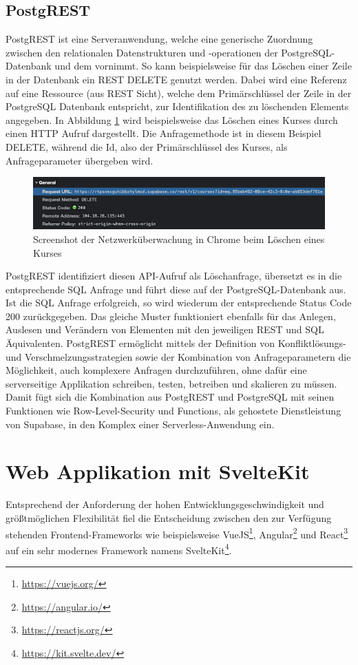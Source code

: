 \subsection{PostgREST}
PostgREST ist eine Serveranwendung, welche eine generische Zuordnung zwischen den relationalen Datenstrukturen und -operationen der PostgreSQL-Datenbank und dem  \cite[Kapitel 5]{fielding00} vornimmt. So kann beispielsweise für das Löschen einer Zeile in der Datenbank ein REST DELETE genutzt werden. Dabei wird eine Referenz auf eine Ressource (aus REST Sicht), welche dem Primärschlüssel der Zeile in der PostgreSQL Datenbank entspricht, zur Identifikation des zu löschenden Elements angegeben. In Abbildung \ref{fig:delete} wird beispielsweise das Löschen eines Kurses durch einen HTTP Aufruf dargestellt. Die Anfragemethode ist in diesem Beispiel DELETE, während die Id, also der Primärschlüssel des Kurses, als Anfrageparameter übergeben wird.
\begin{figure}[H]
    \centering
    \includegraphics[width = .9\textwidth]{images/rest.png}
    \caption{Screenshot der Netzwerküberwachung in Chrome beim Löschen eines Kurses}
    \label{fig:delete}
\end{figure}
\noindent PostgREST identifiziert diesen API-Aufruf als Löschanfrage, übersetzt es in die entsprechende SQL Anfrage und führt diese auf der PostgreSQL-Datenbank aus. Ist die SQL Anfrage erfolgreich, so wird wiederum der entsprechende Status Code 200 zurückgegeben. Das gleiche Muster funktioniert ebenfalls für das Anlegen, Auslesen und Verändern von Elementen mit den jeweiligen REST und SQL Äquivalenten. PostgREST ermöglicht mittels der Definition von Konfliktlösungs- und Verschmelzungsstrategien sowie der Kombination von Anfrageparametern die Möglichkeit, auch komplexere Anfragen durchzuführen, ohne dafür eine serverseitige Applikation schreiben, testen, betreiben und skalieren zu müssen. Damit fügt sich die Kombination aus PostgREST und PostgreSQL mit seinen Funktionen wie Row-Level-Security und Functions, als gehostete Dienstleistung von Supabase, in den Komplex einer Serverless-Anwendung ein.
\section{Web Applikation mit SvelteKit}
Entsprechend der Anforderung der hohen Entwicklungsgeschwindigkeit und größtmöglichen Flexibilität fiel die Entscheidung zwischen den zur Verfügung stehenden Frontend-Frameworks wie beispielsweise VueJS\footnote{\url{https://vuejs.org/}}, Angular\footnote{\url{https://angular.io/}} und React\footnote{\url{https://reactjs.org/}} auf ein sehr modernes Framework namens SvelteKit\footnote{\url{https://kit.svelte.dev/}}.
